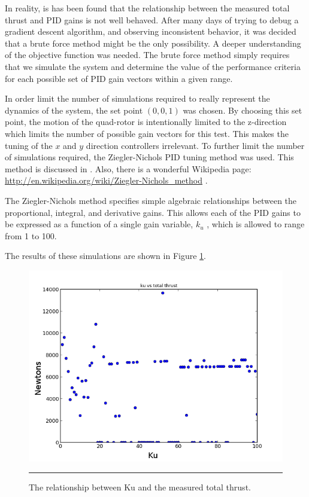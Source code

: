 In reality, is has been found that the relationship between the measured total thrust and PID gains is not well behaved. After many days of trying to debug a gradient descent algorithm, and observing inconsistent behavior, it was decided that a brute force method might be the only possibility. A deeper understanding of the objective function was needed. The brute force method simply requires that we simulate the system and determine the value of the performance criteria for each possible set of PID gain vectors within a given range. 

In order limit the number of simulations required to really represent the dynamics of the system, the set point $(0,0,1)$ was chosen. By choosing this set point, the motion of the quad-rotor is intentionally limited to the z-direction which limits the number of possible gain vectors for this test. This makes the tuning of the $x$ and $y$ direction controllers irrelevant. To further limit the number of simulations required, the Ziegler-Nichols PID tuning method was used. This method is discussed in \cite{ziegler1942optimum}. Also, there is a wonderful Wikipedia page: \url{http://en.wikipedia.org/wiki/Ziegler-Nichols_method} . 

The Ziegler-Nichols method specifies simple algebraic relationships between the proportional, integral, and derivative gains. This allows each of the PID gains to be expressed as a function of a single gain variable, $k_u$ , which is allowed to range from 1 to 100.




 The results of these simulations are shown in Figure \ref{fig:ku vs thrust}.

 
\begin{figure}[htbp]
	\centering
		\includegraphics{Figures/kuvsthrust.png}
		\rule{35em}{0.5pt}
	\caption[ku vs thrust]{The relationship between Ku and the measured total thrust.}
	\label{fig:ku vs thrust}
\end{figure}

